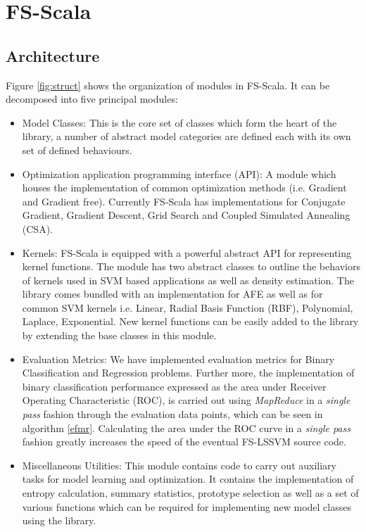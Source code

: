 \chapter{FS-Scala}
\label{cha:2}

\section{Architecture}
Figure \ref{fig:struct} shows the organization of modules in FS-Scala. It can be decomposed into five principal modules:
\begin{itemize}
\item Model Classes:
This is the core set of classes which form the heart of the library, a number of abstract model categories are defined each with its own set of defined behaviours. 
\item Optimization application programming interface (API):
A module which houses the implementation of common optimization methods (i.e. Gradient and Gradient free). Currently FS-Scala has implementations for Conjugate Gradient, Gradient Descent, Grid Search and Coupled Simulated Annealing \cite{Xavier-De-Souza2010} (CSA). 
\item Kernels:
FS-Scala is equipped with a powerful abstract API for representing kernel functions. The module has two abstract classes to outline the behaviors of kernels used in SVM based applications as well as density estimation. The library comes bundled with an implementation for AFE as well as for common SVM kernels i.e. Linear, Radial Basis Function (RBF), Polynomial, Laplace, Exponential. New kernel functions can be easily added to the library by extending the base classes in this module.
\item Evaluation Metrics:
We have implemented evaluation metrics for Binary Classification and Regression problems. Further more, the implementation of binary classification performance expressed as the area under Receiver Operating Characteristic (ROC), is carried out using \textit{MapReduce} in a \textit{single pass} fashion through the evaluation data points, which can be seen in algorithm \ref{efmr}. Calculating the area under the ROC curve in a \textit{single pass} fashion greatly increases the speed of the eventual FS-LSSVM source code.
\item Miscellaneous Utilities:
This module contains code to carry out auxiliary tasks for model learning and optimization. It contains the implementation of entropy calculation, summary statistics, prototype selection as well as a set of various functions which can be required for implementing new model classes using the library.  

\end{itemize}


